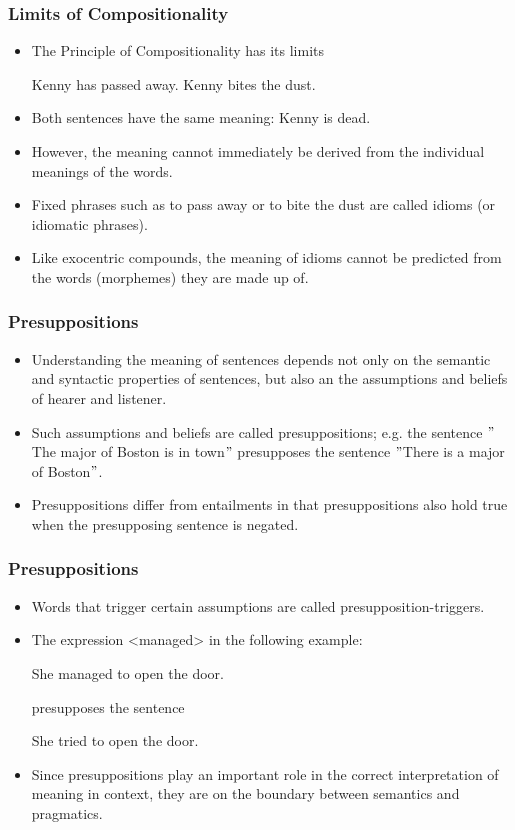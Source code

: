 \documentclass[12pt, table]{beamer}
\begin{document}
\begin{frame}
\frametitle{Limits of Compositionality}
\begin{itemize}
\item The Principle of Compositionality has its limits
\begin{exe}
\ex Kenny has passed away.
\ex Kenny bites the dust.
\end{exe}
\item Both sentences have the same meaning: Kenny is dead.
\item However, the meaning cannot immediately be derived from the individual meanings of the words.
\item Fixed phrases such as to pass away or to bite the dust are called idioms (or idiomatic phrases).
\item Like exocentric compounds, the meaning of idioms cannot be predicted from the words (morphemes) they are made up of.
\end{itemize}
\end{frame}

\begin{frame}
\frametitle{Presuppositions}
\begin{itemize}
\item Understanding the meaning of sentences depends not only on the semantic and syntactic properties of sentences, but also an the assumptions and beliefs of hearer and listener. 
\item Such assumptions and beliefs are called presuppositions; e.g. the sentence $"$The major of Boston is in town$"$  presupposes the sentence $"$There is a major of Boston$"$.
\item Presuppositions differ from entailments in that presuppositions also hold true when the presupposing sentence is negated.
\end{itemize}
\end{frame}

\begin{frame}
\frametitle{Presuppositions}
\begin{itemize}
\item Words that trigger certain assumptions are called presupposition-triggers.
\item The expression <managed> in the following example:
\begin{exe}
\ex She managed to open the door. 
\end{exe}
presupposes the sentence 
\begin{exe}
\ex She tried to open the door.
\end{exe}
\item Since presuppositions play an important role in the correct interpretation of meaning in context, they are on the boundary between semantics and pragmatics.
\end{itemize}
\end{frame}
\end{document}
